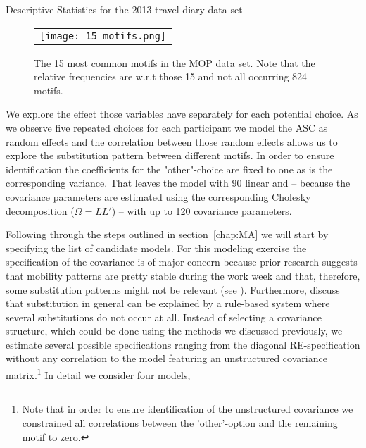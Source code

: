 \documentclass[12pt, a4paper]{article}
\numberwithin{defcounter}{section}
\numberwithin{excounter}{section}
\begin{document}
\begin{table}[t]
\centering
\caption{Descriptive Statistics for the 2013 travel diary data set}

\label{tab:des}
\end{table}

\begin{landscape}
\begin{figure}%
{\caption{The 15 most common motifs in the MOP data set. Note that the relative frequencies are w.r.t those 15 and not all occurring 824 motifs.}\label{fig:mot}}%
\begin{tabular}{@{}r@{}} 
\texttt{[image: 15\_motifs.png]}\\
\end{tabular}
\end{figure}
\end{landscape}


We explore the effect those variables have separately for each potential choice. As we observe five repeated choices for each participant we model the \ac{ASC} as random effects and the correlation between those random effects allows us to explore the substitution pattern between different motifs. In order to ensure identification the coefficients for the "other"-choice are fixed to one as is the corresponding variance. That leaves the model with 90 linear and  -- because the covariance parameters are estimated using the corresponding Cholesky decomposition ($\Omega = LL'$) -- with up to 120 covariance parameters.

Following through the steps outlined in section~\ref{chap:MA} we will start by specifying the list of candidate models. For this modeling exercise the specification of the covariance is of major concern because prior research suggests that mobility patterns are pretty stable during the work week and that, therefore, some substitution patterns might not be relevant (see \citep{schneider2013}). Furthermore, \cite{schneider2013} discuss that substitution in general can be explained by a rule-based system where several substitutions do not occur at all.  Instead of selecting a covariance structure, which could be done using the methods we discussed previously, we estimate several possible specifications ranging from the diagonal RE-specification without any correlation to the model featuring an unstructured covariance matrix.\footnote{Note that in order to ensure identification of the unstructured covariance we constrained all correlations between the 'other'-option and the remaining motif to zero.} In detail we consider four models,
\end{document}
